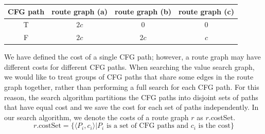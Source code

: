 \documentclass[12pt]{gatech-thesis}
\begin{document}
\begin{center}
\begin{tabular}{|c|c|c|c|}
  \hline
  CFG path & route graph (a) & route graph (b) & route graph (c) \\
  \hline\hline
  T & $2c$ & $0$ & 0 \\
  \hline
  F & $2c$ & $2c$ & $c$ \\
  \hline
\end{tabular}
\end{center}

We have defined the cost of a single CFG path; however, a route graph may have different costs for different CFG paths.
When searching the value search graph, we would like to treat groups of CFG paths that share some edges in the route graph together, rather than performing a full search for each CFG path.
For this reason, the search algorithm partitions the CFG paths into disjoint sets of paths that have equal cost and we save the cost for each set of paths independently. 
In our search algorithm, we denote the costs of a route graph $r$ as $r.$costSet.
\[ r.\text{costSet} = \{ \langle P_{i}, c_{i} \rangle | P_{i}\text{ is a set of CFG paths and } c_{i} \text{ is the cost}\} \]
\end{document}
